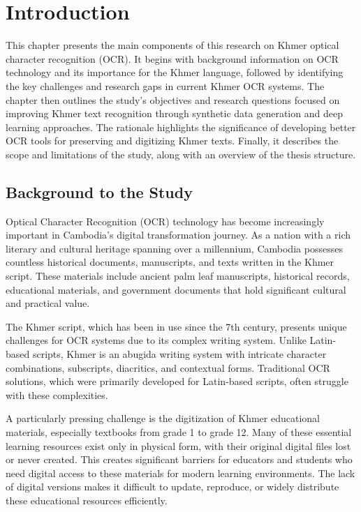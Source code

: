 \label{ch:intro}
\chapter{Introduction}

This chapter presents the main components of this research on Khmer optical character recognition (OCR). It begins with background information on OCR technology and its importance for the Khmer language, followed by identifying the key challenges and research gaps in current Khmer OCR systems. The chapter then outlines the study's objectives and research questions focused on improving Khmer text recognition through synthetic data generation and deep learning approaches. The rationale highlights the significance of developing better OCR tools for preserving and digitizing Khmer texts. Finally, it describes the scope and limitations of the study, along with an overview of the thesis structure.

\section{Background to the Study}
\label{sec:background}


Optical Character Recognition (OCR) technology has become increasingly important in Cambodia's digital transformation journey. As a nation with a rich literary and cultural heritage spanning over a millennium, Cambodia possesses countless historical documents, manuscripts, and texts written in the Khmer script. These materials include ancient palm leaf manuscripts, historical records, educational materials, and government documents that hold significant cultural and practical value.

The Khmer script, which has been in use since the 7th century, presents unique challenges for OCR systems due to its complex writing system. Unlike Latin-based scripts, Khmer is an abugida writing system with intricate character combinations, subscripts, diacritics, and contextual forms. Traditional OCR solutions, which were primarily developed for Latin-based scripts, often struggle with these complexities.

A particularly pressing challenge is the digitization of Khmer educational materials, especially textbooks from grade 1 to grade 12. Many of these essential learning resources exist only in physical form, with their original digital files lost or never created. This creates significant barriers for educators and students who need digital access to these materials for modern learning environments. The lack of digital versions makes it difficult to update, reproduce, or widely distribute these educational resources efficiently.


